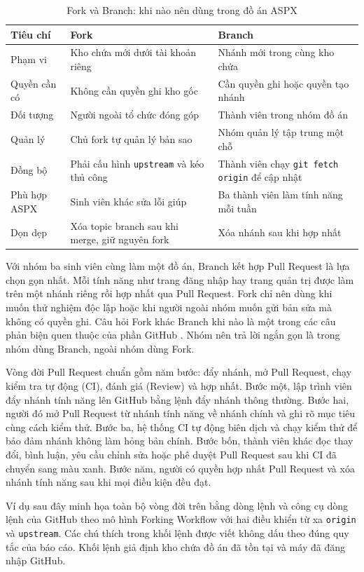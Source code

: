 \begin{table}[H]
\centering
\begin{tabular}{lll}
\toprule
Tiêu chí & Fork & Branch \\
\midrule
Phạm vi & Kho chứa mới dưới tài khoản riêng & Nhánh mới trong cùng kho chứa \\
Quyền cần có & Không cần quyền ghi kho gốc & Cần quyền ghi hoặc quyền tạo nhánh \\
Đối tượng & Người ngoài tổ chức đóng góp & Thành viên trong nhóm đồ án \\
Quản lý & Chủ fork tự quản lý bản sao & Nhóm quản lý tập trung một chỗ \\
Đồng bộ & Phải cấu hình \verb|upstream| và kéo thủ công & Thành viên chạy \verb|git fetch origin| để cập nhật \\
Phù hợp ASPX & Sinh viên khác sửa lỗi giúp & Ba thành viên làm tính năng mỗi tuần \\
Dọn dẹp & Xóa topic branch sau khi merge, giữ nguyên fork & Xóa nhánh sau khi hợp nhất \\
\bottomrule
\end{tabular}
\caption{Fork và Branch: khi nào nên dùng trong đồ án ASPX}
\label{tab:c4-fork-branch}
\end{table}

Với nhóm ba sinh viên cùng làm một đồ án, Branch kết hợp Pull Request là lựa chọn gọn nhất.
Mỗi tính năng như trang đăng nhập hay trang quản trị được làm trên một nhánh riêng rồi hợp nhất qua Pull Request.
Fork chỉ nên dùng khi muốn thử nghiệm độc lập hoặc khi người ngoài nhóm muốn gửi bản sửa mà không có quyền ghi.
Câu hỏi Fork khác Branch khi nào là một trong các câu phản biện quen thuộc của phần GitHub \cite{atlassiangit}.
Nhóm nên trả lời ngắn gọn là trong nhóm dùng Branch, ngoài nhóm dùng Fork.

Vòng đời Pull Request chuẩn gồm năm bước: đẩy nhánh, mở Pull Request, chạy kiểm tra tự động (CI), đánh giá (Review) và hợp nhất.
Bước một, lập trình viên đẩy nhánh tính năng lên GitHub bằng lệnh đẩy nhánh thông thường.
Bước hai, người đó mở Pull Request từ nhánh tính năng về nhánh chính và ghi rõ mục tiêu cùng cách kiểm thử.
Bước ba, hệ thống CI tự động biên dịch và chạy kiểm thử để bảo đảm nhánh không làm hỏng bản chính.
Bước bốn, thành viên khác đọc thay đổi, bình luận, yêu cầu chỉnh sửa hoặc phê duyệt Pull Request sau khi CI đã chuyển sang màu xanh.
Bước năm, người có quyền hợp nhất Pull Request và xóa nhánh tính năng sau khi mọi điều kiện đều đạt.

Ví dụ sau đây minh họa toàn bộ vòng đời trên bằng dòng lệnh và công cụ dòng lệnh của GitHub theo mô hình Forking Workflow với hai điều khiển từ xa \verb|origin| và \verb|upstream|.
Các chú thích trong khối lệnh được viết không dấu theo đúng quy tắc của báo cáo.
Khối lệnh giả định kho chứa đồ án đã tồn tại và máy đã đăng nhập GitHub.

